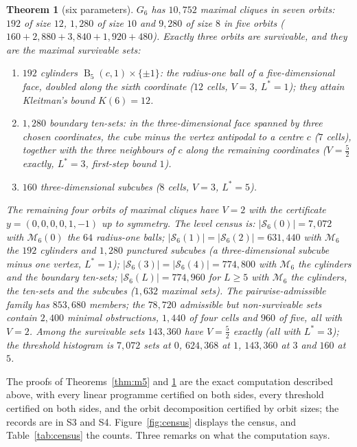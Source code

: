 \documentclass[11pt,a4paper]{article}
\theoremstyle{plain}
\newtheorem{theorem}{Theorem}[section]
\theoremstyle{definition}
\theoremstyle{remark}
\newcommand{\calM}{\mathcal{M}}
\newcommand{\calS}{\mathcal{S}}
\newcommand{\Ball}{\operatorname{B}}
\newcommand{\tfr}[2]{\tfrac{#1}{#2}}
\newcommand{\Lstar}{L^{\ast}}
\begin{document}
\begin{theorem}[six parameters]\label{thm:m6}
$G_6$ has $10{,}752$ maximal cliques in seven orbits: $192$ of size $12$, $1{,}280$ of size $10$ and $9{,}280$ of size $8$ in five orbits ($160+2{,}880+3{,}840+1{,}920+480$). Exactly three orbits are survivable, and they are the maximal survivable sets:
\begin{enumerate}[leftmargin=2em,itemsep=1pt]
\item $192$ \emph{cylinders} $\Ball_5(c,1)\times\{\pm1\}$: the radius-one ball of a five-dimensional face, doubled along the sixth coordinate ($12$ cells, $V=3$, $\Lstar=1$); they attain Kleitman's bound $K(6)=12$.
\item $1{,}280$ \emph{boundary ten-sets}: in the three-dimensional face spanned by three chosen coordinates, the cube minus the vertex antipodal to a centre $c$ ($7$ cells), together with the three neighbours of $c$ along the remaining coordinates ($V=\tfr52$ exactly, $\Lstar=3$, first-step bound $1$).
\item $160$ \emph{three-dimensional subcubes} ($8$ cells, $V=3$, $\Lstar=5$).
\end{enumerate}
The remaining four orbits of maximal cliques have $V=2$ with the certificate $y=(0,0,0,0,1,-1)$ up to symmetry. The level census is: $|\calS_6(0)|=7{,}072$ with $\calM_6(0)$ the $64$ radius-one balls; $|\calS_6(1)|=|\calS_6(2)|=631{,}440$ with $\calM_6$ the $192$ cylinders and $1{,}280$ \emph{punctured subcubes} (a three-dimensional subcube minus one vertex, $\Lstar=1$); $|\calS_6(3)|=|\calS_6(4)|=774{,}800$ with $\calM_6$ the cylinders and the boundary ten-sets; $|\calS_6(L)|=774{,}960$ for $L\ge5$ with $\calM_6$ the cylinders, the ten-sets and the subcubes ($1{,}632$ maximal sets). The pairwise-admissible family has $853{,}680$ members; the $78{,}720$ admissible but non-survivable sets contain $2{,}400$ minimal obstructions, $1{,}440$ of four cells and $960$ of five, all with $V=2$. Among the survivable sets $143{,}360$ have $V=\tfr52$ exactly (all with $\Lstar=3$); the threshold histogram is $7{,}072$ sets at $0$, $624{,}368$ at $1$, $143{,}360$ at $3$ and $160$ at $5$.
\end{theorem}

The proofs of Theorems~\ref{thm:m5} and \ref{thm:m6} are the exact computation described above, with every linear programme certified on both sides, every threshold certified on both sides, and the orbit decomposition certified by orbit sizes; the records are in S3 and S4. Figure~\ref{fig:census} displays the census, and Table~\ref{tab:census} the counts. Three remarks on what the computation says.
\end{document}
